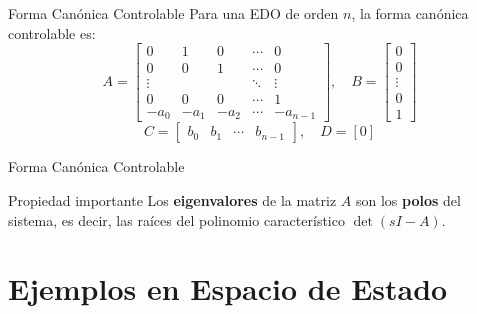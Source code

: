 \documentclass[aspectratio=169,xcolor=dvipsnames]{beamer}
\begin{document}
\begin{frame}{Forma Can\'onica Controlable}
    Para una EDO de orden $n$, la forma can\'onica controlable es:
    \begin{equation}
        A = \begin{bmatrix}
            0 & 1 & 0 & \cdots & 0 \\
            0 & 0 & 1 & \cdots & 0 \\
            \vdots & & & \ddots & \vdots \\
            0 & 0 & 0 & \cdots & 1 \\
            -a_0 & -a_1 & -a_2 & \cdots & -a_{n-1}
        \end{bmatrix}, \quad
        B = \begin{bmatrix} 0 \\ 0 \\ \vdots \\ 0 \\ 1 \end{bmatrix}
    \end{equation}
    \begin{equation}
        C = \begin{bmatrix} b_0 & b_1 & \cdots & b_{n-1} \end{bmatrix}, \quad D = [0]
    \end{equation}
\end{frame}
\begin{frame}{Forma Can\'onica Controlable}

    \begin{exampleblock}{Propiedad importante}
        Los \textbf{eigenvalores} de la matriz $A$ son los \textbf{polos} del sistema, es decir, las ra\'ices del polinomio caracter\'istico $\det(sI - A)$.
    \end{exampleblock}
\end{frame}

\section{Ejemplos en Espacio de Estado}
\end{document}
